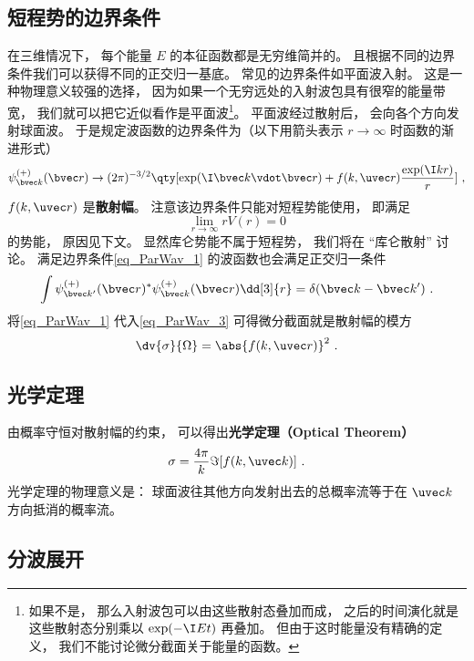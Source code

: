 \subsection{短程势的边界条件}
在三维情况下， 每个能量 $E$ 的本征函数都是无穷维简并的。 且根据不同的边界条件我们可以获得不同的正交归一基底。 常见的边界条件如平面波入射。 这是一种物理意义较强的选择， 因为如果一个无穷远处的入射波包具有很窄的能量带宽， 我们就可以把它近似看作是平面波\footnote{如果不是， 那么入射波包可以由这些散射态叠加而成， 之后的时间演化就是这些散射态分别乘以 $\exp(-\I E t)$ 再叠加。 但由于这时能量没有精确的定义， 我们不能讨论微分截面关于能量的函数。}。 平面波经过散射后， 会向各个方向发射球面波。 于是规定波函数的边界条件为（以下用箭头表示 $r\to\infty$ 时函数的渐进形式）
\begin{equation}\label{eq_ParWav_1}
\psi_{\bvec k}^{(+)}(\bvec r) \rightarrow (2\pi)^{-3/2} \qty[\exp(\I \bvec k \vdot \bvec r) + f(k, \uvec r) \frac{\exp(\I k r)}{r}]~,
\end{equation}
$f(k, \uvec r)$ 是\textbf{散射幅}。 注意该边界条件只能对短程势能使用， 即满足
\begin{equation}
\lim_{r\to\infty} r V(r) = 0
\end{equation}
的势能， 原因见下文。 显然库仑势能不属于短程势， 我们将在 “库仑散射” 讨论。 满足边界条件\autoref{eq_ParWav_1} 的波函数也会满足正交归一条件
\begin{equation}
\int \psi_{\bvec k'}^{(+)}(\bvec r)^* \psi_{\bvec k}^{(+)}(\bvec r) \dd[3]{r} = \delta(\bvec k - \bvec k')~.
\end{equation}
将\autoref{eq_ParWav_1} 代入\autoref{eq_ParWav_3} 可得微分截面就是散射幅的模方
\begin{equation}
\dv{\sigma}{\Omega} = \abs{f(k, \uvec r)}^2~.
\end{equation}

\subsection{光学定理}
由概率守恒对散射幅的约束， 可以得出\textbf{光学定理（Optical Theorem）}
\begin{equation}
\sigma = \frac{4\pi}{k} \Im[f(k, \uvec k)]~.
\end{equation}
光学定理的物理意义是： 球面波往其他方向发射出去的总概率流等于在 $\uvec k$ 方向抵消的概率流。

\subsection{分波展开}

